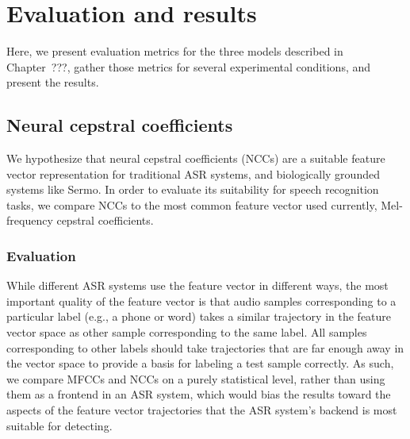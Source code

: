 \chapter{Evaluation and results}




Here,
we present evaluation metrics for the three models
described in Chapter~???,
gather those metrics
for several experimental conditions,
and present the results.

\section{Neural cepstral coefficients}

We hypothesize that
neural cepstral coefficients (NCCs)
are a suitable feature vector representation
for traditional ASR systems,
and biologically grounded systems like Sermo.
In order to evaluate
its suitability for speech recognition tasks,
we compare NCCs to the most common
feature vector used currently,
Mel-frequency cepstral coefficients.

\subsection{Evaluation}

While different ASR systems
use the feature vector in different ways,
the most important quality of the feature vector
is that audio samples corresponding
to a particular label
(e.g., a phone or word)
takes a similar trajectory
in the feature vector space
as other sample corresponding to the same label.
All samples corresponding to other labels
should take trajectories that are
far enough away in the vector space
to provide a basis for labeling
a test sample correctly.
As such, we compare MFCCs and NCCs
on a purely statistical level,
rather than using them as a frontend
in an ASR system,
which would bias the results
toward the aspects of the
feature vector trajectories
that the ASR system's backend
is most suitable for detecting.

